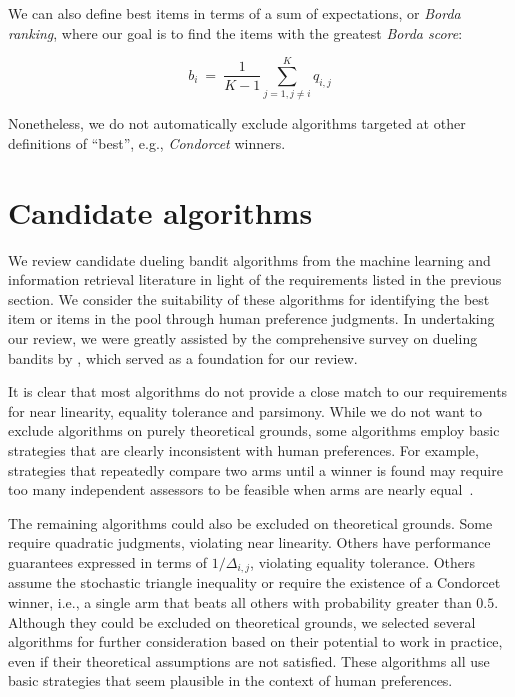 We can also define best items in terms of a sum of expectations, or {\em Borda ranking}, where our goal is to find the items with the greatest {\em Borda score}:

\begin{equation}
b_i~=~\frac{1}{K - 1}\sum_{j = 1, j \ne i}^K q_{i,j}
\end{equation}

Nonetheless, we do not automatically exclude algorithms targeted at other definitions of ``best'', e.g.,
\emph{Condorcet} winners.

\section{Candidate algorithms}

We review candidate dueling bandit algorithms from the machine learning and information retrieval literature in light of the requirements listed in the previous section. We consider the suitability of these algorithms for identifying the best item or items in the pool through human preference judgments. In undertaking our review, we were greatly assisted by the comprehensive survey on dueling bandits by \citet{bbmh21}, which served as a foundation for our review. 

It is clear that most algorithms do not provide a close match to our requirements for near linearity, equality tolerance and parsimony.  While we do not want to exclude algorithms on purely theoretical grounds, some algorithms employ basic strategies that are clearly inconsistent with human preferences. For example, strategies that repeatedly compare two arms until a winner is found may require too many independent assessors to be feasible when arms are nearly equal~\cite{falahatgar2017maximum, falahatgar2017maxing, ren2020sample}.

The remaining algorithms could also be excluded on theoretical grounds. Some require quadratic judgments, violating near linearity. Others have performance guarantees expressed in terms of $1/\Delta_{i,j}$, violating equality tolerance. Others assume the stochastic triangle inequality or require the existence of a Condorcet winner, i.e., a single arm that beats all others with probability greater than $0.5$. Although they could be excluded on theoretical grounds, we selected several algorithms for further consideration based on their potential to work in practice, even if their theoretical assumptions are not satisfied. These algorithms all use basic strategies that seem plausible in the context of human preferences.

